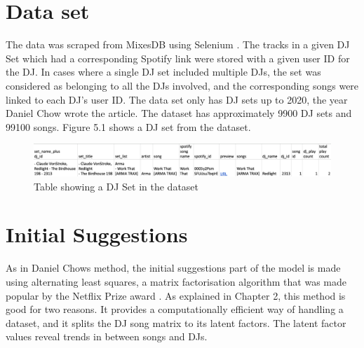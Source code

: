 \section{Data set}
The data was scraped from MixesDB using Selenium \citep{chow_music_2020}. The tracks in a given DJ Set which had a corresponding Spotify link were stored with a given user ID for the DJ.  In cases where a single DJ set included multiple DJs, the set was considered as belonging to all the DJs involved, and the corresponding songs were linked to each DJ's user ID. The data set only has DJ sets up to 2020, the year Daniel Chow wrote the article. The dataset has approximately 9900 DJ sets and 99100 songs. Figure 5.1 shows a DJ set from the dataset.
\begin{figure}[H]
	\includegraphics[scale=0.4]{images/dataset}
	\centering
	\caption{Table showing a DJ Set in the dataset} 
\end{figure}


\section{Initial Suggestions}
As in Daniel Chows method, the initial suggestions part of the model is made using alternating least squares, a matrix factorisation algorithm that was made popular by the Netflix Prize award \citep{zhou_large-scale_2008}. As explained in Chapter 2, this method is good for two reasons. It provides a computationally efficient way of handling a dataset, and it splits the DJ song matrix to its latent factors. The latent factor values reveal trends in between songs and DJs.


